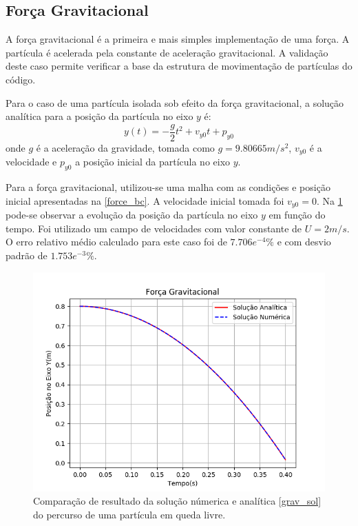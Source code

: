 \subsection{\textbf{Força Gravitacional}}
\label{sec_grav}
A força gravitacional é a primeira e mais simples implementação de uma força.
A partícula é acelerada pela constante de aceleração gravitacional.
A validação deste caso permite verificar a base da estrutura de movimentação de partículas do código.

Para o caso de uma partícula isolada sob efeito da força gravitacional, a solução analítica para a posição da partícula no eixo $y$ é:
\begin{equation}
    y(t) = -\dfrac{g}{2}t^2 + v_{y0}t + p_{y0}
    \label{grav_sol} 
\end{equation}
onde $g$ é a aceleração da gravidade, tomada como $g=9.80665m/s^2$, $v_{y0}$ é a velocidade e $p_{y0}$ a posição inicial da partícula no eixo $y$.

Para a força gravitacional, utilizou-se uma malha com as condições e posição inicial apresentadas na \ref{force_bc}.
A velocidade inicial tomada foi $v_{y0}=0$.
Na \ref{grav_comp} pode-se observar a evolução da posição da partícula no eixo $y$ em função do tempo.
Foi utilizado um campo de velocidades com valor constante de $U=2m/s$.
O erro relativo médio calculado para este caso foi de $7.706e^{-4}\%$ e com desvio padrão de $1.753e^{-3}\%$.
\begin{figure}[H]
    \centering
    \includegraphics[width=.7\linewidth]{figures/Forces_gravitational_validation.png}
    \caption{Comparação de resultado da solução númerica e analítica \ref{grav_sol} do percurso de uma partícula em queda livre.}
    \label{grav_comp}
\end{figure}

